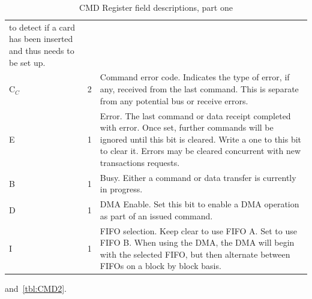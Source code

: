 \documentclass{gqtekspec}
\begin{document}
\begin{table}
\begin{center}
\begin{tabular}{|p{1.2in}|p{0.5in}|p{4.0in}|}
	to detect if a card has been inserted and thus needs to be set up. \\
C$_C$&2& Command error code.  Indicates the type of error, if any, received
	from the last command.  This is separate from any potential bus or
	receive errors. \\
E & 1 & Error.  The last command or data receipt completed with error.  
	Once set, further commands will be ignored until this bit is cleared.
	Write a one to this bit to clear it.  Errors may be cleared concurrent
	with new transactions requests. \\
B & 1 & Busy.  Either a command or data transfer is currently in progress.\\
D & 1 & DMA Enable.  Set this bit to enable a DMA operation as part of an
	issued command. \\
I & 1 & FIFO selection.  Keep clear to use FIFO A.  Set to use FIFO B.
	When using the DMA, the DMA will begin with the selected FIFO, but then
	alternate between FIFOs on a block by block basis.  \\\hline
\end{tabular}
\caption{CMD Register field descriptions, part one}\label{tbl:CMD1}
\end{center}\end{table}
and~\ref{tbl:CMD2}.
\end{document}
